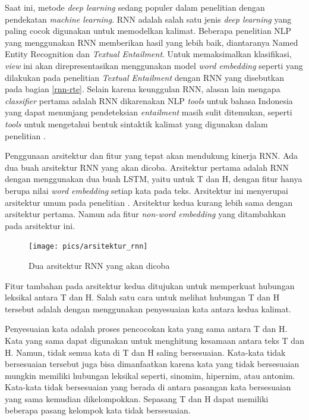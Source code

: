 	Saat ini, metode \textit{deep learning} sedang populer dalam penelitian dengan pendekatan \textit{machine learning}. RNN adalah salah satu jenis \textit{deep learning} yang paling cocok digunakan untuk memodelkan kalimat. Beberapa penelitian NLP yang menggunakan RNN memberikan hasil yang lebih baik, diantaranya Named Entity Recognition \citep{Hammerton:2003:CONLL} dan \textit{Textual Entailment}. Untuk memaksimalkan klasifikasi, \textit{view} ini akan direpresentasikan menggunakan model \textit{word embedding} seperti yang dilakukan pada penelitian \textit{Textual Entailment} dengan RNN yang disebutkan pada bagian \ref{rnn-rte}. Selain karena keunggulan RNN, alasan lain mengapa \textit{classifier} pertama adalah RNN dikarenakan NLP \textit{tools} untuk bahasa Indonesia yang dapat menunjang pendeteksian \textit{entailment} masih sulit ditemukan, seperti \textit{tools} untuk mengetahui bentuk sintaktik kalimat yang digunakan dalam penelitian \cite{zanzottoRTEexpand}.
	
	Penggunaan arsitektur dan fitur yang tepat akan mendukung kinerja RNN. Ada dua buah arsitektur RNN yang akan dicoba. Arsitektur pertama adalah RNN dengan menggunakan dua buah LSTM, yaitu untuk T dan H, dengan fitur hanya berupa nilai \textit{word embedding} setiap kata pada teks. Arsitektur ini menyerupai arsitektur umum pada penelitian \cite{snli:emnlp2015}. Arsitektur kedua kurang lebih sama dengan arsitektur pertama. Namun ada fitur \textit{non-word embedding} yang ditambahkan pada arsitektur ini. 
	\begin{figure}
		\centering
		\texttt{[image: pics/arsitektur\_rnn]}
		\caption{Dua arsitektur RNN yang akan dicoba}
		\label{fig:arsitektur_rnn}
	\end{figure}
	Fitur tambahan pada arsitektur kedua ditujukan untuk memperkuat hubungan leksikal antara T dan H. Salah satu cara untuk melihat hubungan T dan H tersebut adalah dengan menggunakan penyesuaian kata antara kedua kalimat.
	
	Penyesuaian kata adalah proses pencocokan kata yang sama antara T dan H. Kata yang sama dapat digunakan untuk menghitung kesamaan antara teks T dan H. Namun, tidak semua kata di T dan H saling bersesuaian. Kata-kata tidak bersesuaian tersebut juga bisa dimanfaatkan karena kata yang tidak bersesuaian mungkin memiliki hubungan leksikal seperti, sinomim, hipernim, atau antonim. Kata-kata tidak bersesuaian yang berada di antara pasangan kata bersesuaian yang sama kemudian dikelompokkan. Sepasang T dan H dapat memiliki beberapa pasang kelompok kata tidak bersesuaian. 
	
